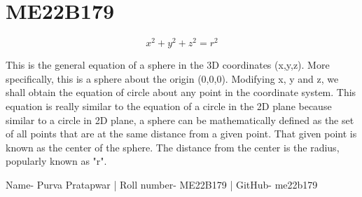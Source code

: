 \section{ME22B179}

\begin{equation}
    x^2+y^2+z^2=r^2
\end{equation}

This is the general equation of a sphere in the 3D coordinates (x,y,z). More specifically, this is a sphere about the origin (0,0,0). Modifying x, y and z, we shall obtain the equation of circle about any point in the coordinate system. This equation is really similar to the equation of a circle in the 2D plane because similar to a circle in 2D plane, a sphere can be mathematically defined as the set of all points that are at the same distance from a given point. That given point is known as the center of the sphere. The distance from the center is the radius, popularly known as "r".

Name- Purva Pratapwar | Roll number- ME22B179 | GitHub- me22b179